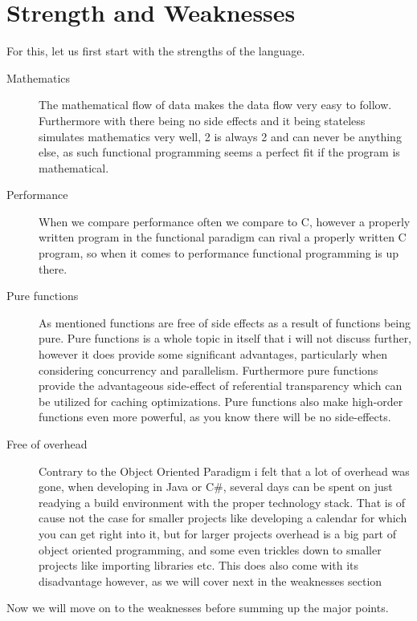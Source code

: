 \documentclass[11pt,a4paper,article,oneside]{memoir}
\begin{document}
\section{Strength and Weaknesses}
For this, let us first start with the strengths of the language.
\begin{description}
    \item [Mathematics]
    The mathematical flow of data makes the data flow very easy to follow.
    Furthermore with there being no side effects and it being stateless simulates mathematics very well, 2 is always 2 and can never be anything else, as such functional programming seems a perfect fit if the program is mathematical.
    \item [Performance]
    When we compare performance often we compare to C, however a properly written program in the functional paradigm can rival a properly written C program, so when it comes to performance functional programming is up there.
    \item [Pure functions]
    As mentioned functions are free of side effects as a result of functions being pure.
    Pure functions is a whole topic in itself that i will not discuss further, however it does provide some significant advantages, particularly when considering concurrency and parallelism.
    Furthermore pure functions provide the advantageous side-effect of referential transparency which can be utilized for caching optimizations.
    Pure functions also make high-order functions even more powerful, as you know there will be no side-effects.
    \item [Free of overhead]
    Contrary to the Object Oriented Paradigm i felt that a lot of overhead was gone, when developing in Java or C#, several days can be spent on just readying a build environment with the proper technology stack.
    That is of cause not the case for smaller projects like developing a calendar for which you can get right into it, but for larger projects overhead is a big part of object oriented programming, and some even trickles down to smaller projects like importing libraries etc.
    This does also come with its disadvantage however, as we will cover next in the weaknesses section
\end{description}
Now we will move on to the weaknesses before summing up the major points.
\end{document}
